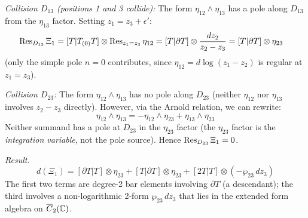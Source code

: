 \begin{computation}
\emph{Collision $D_{13}$ (positions 1 and 3 collide):}
The form $\eta_{12} \wedge \eta_{13}$ has a pole along $D_{13}$
from the $\eta_{13}$ factor.  Setting $z_1 = z_3 + \epsilon'$:
\begin{align*}
\operatorname{Res}_{D_{13}}\Xi_1
&= [T|T_{(0)}T] \otimes \operatorname{Res}_{z_1=z_3}\eta_{12}
= [T|\partial T] \otimes \frac{dz_2}{z_2-z_3}
= [T|\partial T] \otimes \eta_{23}
\end{align*}
(only the simple pole $n = 0$ contributes, since $\eta_{12}
= d\log(z_1-z_2)$ is regular at $z_1 = z_3$).

\emph{Collision $D_{23}$:}
The form $\eta_{12} \wedge \eta_{13}$ has no pole along $D_{23}$
(neither $\eta_{12}$ nor $\eta_{13}$ involves $z_2 - z_3$ directly).
However, via the Arnold relation, we can rewrite:
\[
\eta_{12} \wedge \eta_{13}
= -\eta_{12} \wedge \eta_{23} + \eta_{13} \wedge \eta_{23}
\]
Neither summand has a pole at $D_{23}$ in the $\eta_{23}$ factor
(the $\eta_{23}$ factor is the \emph{integration variable},
not the pole source).  Hence $\operatorname{Res}_{D_{23}}\Xi_1 = 0$.

\emph{Result.}
\begin{equation}\label{eq:w3-dxi1}
d(\Xi_1) = [\partial T|T] \otimes \eta_{23}
+ [T|\partial T] \otimes \eta_{23}
+ [2T|T] \otimes (-\wp_{23}\,dz_3)
\end{equation}
The first two terms are degree-2 bar elements involving $\partial T$
(a descendant); the third involves a non-logarithmic 2-form
$\wp_{23}\,dz_3$ that lies in the extended form algebra
on $\overline{C}_2(\mathbb{C})$.
\end{computation}

